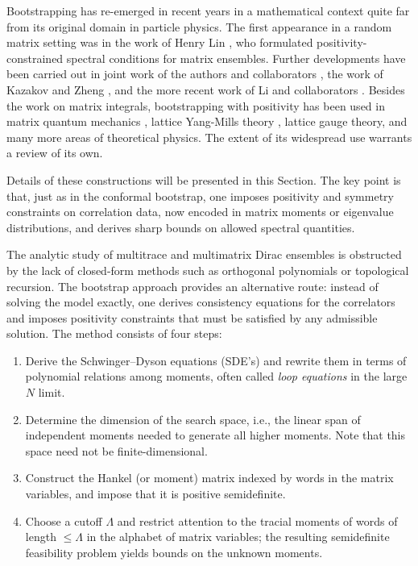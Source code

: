 \documentclass[11pt]{article}
\theoremstyle{plain}
\begin{document}
Bootstrapping has re-emerged in recent years in a mathematical context quite far from its original domain in particle physics. The first appearance in a random matrix setting was in the work of Henry Lin \cite{bootstraps}, who formulated positivity-constrained spectral conditions for matrix ensembles. Further developments have been carried out in joint work of the authors and collaborators \cite{Khalkhali2022,bootstraps critical behaviour}, the  work of Kazakov and Zheng \cite{bootstraps Kazakov}, and the more recent work of Li and collaborators \cite{bootstraps Li analytic trajectory,bootstraps Li Yang-Mills matrix integrals}. Besides the work on matrix integrals, bootstrapping with positivity has been used in matrix quantum mechanics \cite{bootstraps berenstein,bootstraps matrix quantum mechancis cho}, lattice Yang-Mills theory \cite{bootstraps Guo lattice yang-mills}, lattice gauge theory\cite{Anderson,bootstraps Li lattice gauge}, and many more areas of theoretical physics. The extent of its widespread use warrants a review of its own.  

\medskip
Details of these constructions will be presented in this Section. The key point is that, just as in the conformal bootstrap, one imposes positivity and symmetry constraints on correlation data, now encoded in matrix moments or eigenvalue distributions, and derives sharp bounds on allowed spectral quantities.




The analytic study of multitrace and multimatrix Dirac ensembles is obstructed by the lack of closed-form
methods such as orthogonal polynomials or topological recursion. The bootstrap approach provides an
alternative route: instead of solving the model exactly, one derives consistency equations for the correlators
and imposes positivity constraints that must be satisfied by any admissible solution. The method consists of
four steps:

\begin{enumerate}
\item Derive the Schwinger--Dyson equations (SDE's) and rewrite them in terms of polynomial relations among
      moments, often called \emph{loop equations} in the large $N$ limit.
\item Determine the dimension of the search space, i.e., the linear span of independent moments needed
      to generate all higher moments. Note that this space need not be finite-dimensional.
\item Construct the Hankel (or moment) matrix indexed by words in the matrix variables, and impose that
      it is positive semidefinite.
\item Choose a cutoff $\Lambda$ and restrict attention to the tracial moments of words of length $\leq \Lambda$ in the alphabet of matrix variables; the resulting
      semidefinite feasibility problem yields bounds on the unknown moments.
\end{enumerate}
\end{document}
